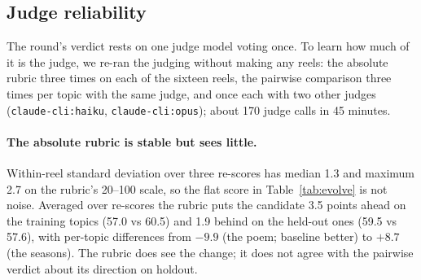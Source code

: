 \documentclass[11pt]{article}
\begin{document}
\subsection{Judge reliability}
\label{sec:reliability}
The round's verdict rests on one judge model voting once. To learn how much of it is the judge, we
re-ran the judging without making any reels: the absolute rubric three times on each of the sixteen
reels, the pairwise comparison three times per topic with the same judge, and once each with two other
judges (\texttt{claude-cli:haiku}, \texttt{claude-cli:opus}); about 170 judge calls in 45 minutes.

\paragraph{The absolute rubric is stable but sees little.} Within-reel standard deviation over three
re-scores has median 1.3 and maximum 2.7 on the rubric's 20--100 scale, so the flat score in
Table~\ref{tab:evolve} is not noise. Averaged over re-scores the rubric puts the candidate 3.5 points
ahead on the training topics (57.0 vs 60.5) and 1.9 behind on the held-out ones (59.5 vs 57.6), with
per-topic differences from $-9.9$ (the poem; baseline better) to $+8.7$ (the seasons). The rubric does
see the change; it does not agree with the pairwise verdict about its direction on holdout.
\end{document}
